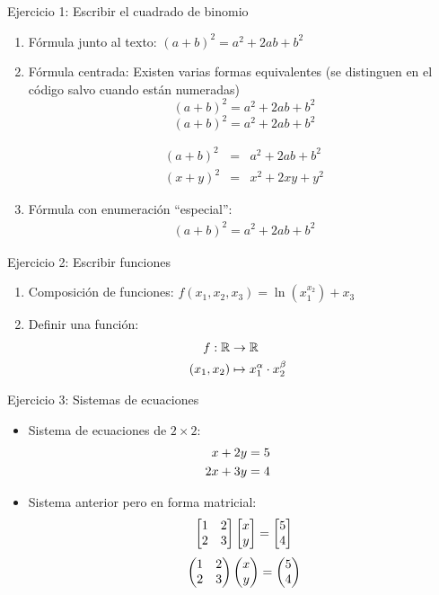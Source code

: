 \documentclass[10pt,a4paper]{article}
\begin{document}
Ejercicio 1: Escribir el cuadrado de binomio

\begin{enumerate}
\item F\'ormula junto al texto: $ (a+b)^2 = a^2 + 2ab + b^2$
\item F\'ormula centrada: Existen varias formas equivalentes (se distinguen en el c\'odigo salvo cuando est\'an numeradas)
	$$(a+b)^2 = a^2 + 2ab + b^2 $$
	\begin{equation}
	(a+b)^2 = a^2 + 2ab + b^2
	\end{equation}

	\begin{eqnarray}
	(a+b)^2 &=& a^2 + 2ab + b^2 \\
	(x+y)^2 &=& x^2 + 2xy + y^2	
	\end{eqnarray}		
\item F\'ormula con enumeraci\'on ``especial'':
	\begin{gather}\tag{Cuadrado de binomio}
	(a+b)^2 = a^2 + 2ab + b^2
	\end{gather}
\end{enumerate}

Ejercicio 2: Escribir funciones
\begin{enumerate}
\item Composici\'on de funciones: $f(x_1,x_2,x_3)=\ln(x_1^{x_2})+x_3$
\item Definir una funci\'on:
	\begin{align}
	f: \mathbb{R} &\to \mathbb{R} \cr
	(x_1,x_2)&\mapsto x_1^\alpha\cdot x_2^\beta
	\end{align}
\end{enumerate}

Ejercicio 3: Sistemas de ecuaciones
\begin{itemize}
\item Sistema de ecuaciones de $2 \times 2$:
	\begin{align*}
	x+2y&=5 \cr
	2x+3y&=4
	\end{align*}
	
\item Sistema anterior pero en forma matricial:
	\begin{gather}	
		\begin{bmatrix}
		1 & 2 \cr
		2 & 3
		\end{bmatrix}
		\begin{bmatrix}
		x \cr
		y
		\end{bmatrix}
		=
		\begin{bmatrix}
		5 \cr
		4
		\end{bmatrix}
	\end{gather}
	\begin{gather}\label{panconqueso}	
		\begin{pmatrix}
		1 & 2 \cr
		2 & 3
		\end{pmatrix}
		\begin{pmatrix}
		x \cr
		y
		\end{pmatrix}
		=
		\begin{pmatrix}
		5 \cr
		4
		\end{pmatrix}
	\end{gather}	
\end{itemize}
\end{document}
